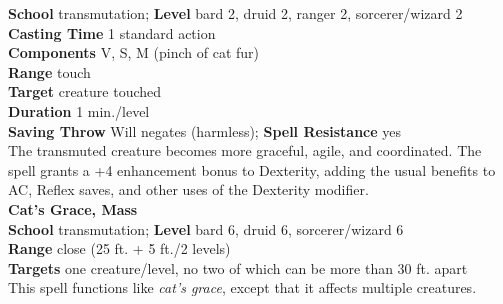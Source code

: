 \textbf{School} transmutation; \textbf{Level} bard 2, druid 2, ranger 2, sorcerer/wizard 2\\
\textbf{Casting Time} 1 standard action\\
\textbf{Components} V, S, M (pinch of cat fur)\\
\textbf{Range} touch\\
\textbf{Target} creature touched\\
\textbf{Duration} 1 min./level\\
\textbf{Saving Throw }Will negates (harmless); \textbf{Spell Resistance} yes\\
The transmuted creature becomes more graceful, agile, and coordinated. The spell grants a +4 enhancement bonus to Dexterity, adding the usual benefits to AC, Reflex saves, and other uses of the Dexterity modifier.\\
\textbf{Cat's Grace, Mass}\\
\textbf{School} transmutation; \textbf{Level} bard 6, druid 6, sorcerer/wizard 6\\
\textbf{Range} close (25 ft. + 5 ft./2 levels)\\
\textbf{Targets} one creature/level, no two of which can be more than 30 ft. apart\\
This spell functions like \textit{cat's grace}, except that it affects multiple creatures.\\
